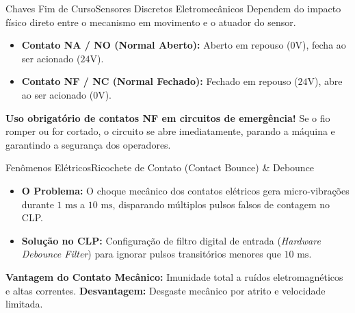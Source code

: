 \begin{senaiframe}{Chaves Fim de Curso}{Sensores Discretos Eletromecânicos}
  Dependem do impacto físico direto entre o mecanismo em movimento e o atuador do sensor.

  \vspace{4pt}
  \begin{itemize}
    \item \textbf{Contato NA / NO (Normal Aberto):} Aberto em repouso ($0\text{V}$), fecha ao ser acionado ($24\text{V}$).
    \item \textbf{Contato NF / NC (Normal Fechado):} Fechado em repouso ($24\text{V}$), abre ao ser acionado ($0\text{V}$).
  \end{itemize}

  \vspace{6pt}
  \begin{tcolorbox}[senairedcard, title={Princípio da Falha Segura (Fail-Safe)}]
    \textbf{Uso obrigatório de contatos NF em circuitos de emergência!} Se o fio romper ou for cortado, o circuito se abre imediatamente, parando a máquina e garantindo a segurança dos operadores.
  \end{tcolorbox}
\end{senaiframe}

\begin{senaiframe}{Fenômenos Elétricos}{Ricochete de Contato (Contact Bounce) \& Debounce}
  \begin{itemize}
    \item \textbf{O Problema:} O choque mecânico dos contatos elétricos gera micro-vibrações durante $1\text{ ms}$ a $10\text{ ms}$, disparando múltiplos pulsos falsos de contagem no CLP.
    \item \textbf{Solução no CLP:} Configuração de filtro digital de entrada (\textit{Hardware Debounce Filter}) para ignorar pulsos transitórios menores que $10\text{ ms}$.
  \end{itemize}

  \vspace{6pt}
  \begin{center}
    \small
    \textbf{Vantagem do Contato Mecânico:} Imunidade total a ruídos eletromagnéticos e altas correntes.  
    \textbf{Desvantagem:} Desgaste mecânico por atrito e velocidade limitada.
  \end{center}
\end{senaiframe}

